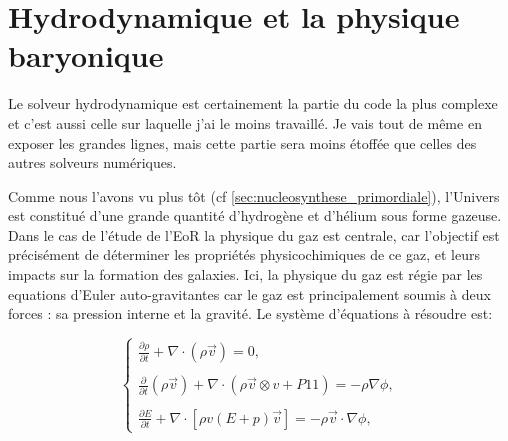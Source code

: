 %




\clearpage
\section{Hydrodynamique et la physique baryonique}
\label{sec:hydro}

Le solveur hydrodynamique est certainement la partie du code la plus complexe et c'est aussi celle sur laquelle j'ai le moins travaillé.
Je vais tout de même en exposer les grandes lignes, mais cette partie sera moins étoffée que celles des autres solveurs numériques.

Comme nous l'avons vu plus tôt (cf \ref{sec:nucleosynthese_primordiale}), l'Univers est constitué d'une grande quantité d'hydrogène et d'hélium sous forme gazeuse.
Dans le cas de l'étude de l'\ac{EoR} la physique du gaz est centrale, car l'objectif est précisément de déterminer les propriétés physicochimiques de ce gaz, et leurs impacts sur la formation des galaxies.
Ici, la physique du gaz est régie par les equations d'Euler auto-gravitantes car le gaz est principalement soumis à deux forces : sa pression interne et la gravité.
Le système d'équations à résoudre est:

\begin{equation}
\begin{cases}

{ \frac{ \partial \rho }{ \partial t } + \nabla \cdot (\rho \vec{v}) = 0}, \\
\\
{ \frac{ \partial }{ \partial t } (\rho \vec{v}) + \nabla \cdot (\rho \vec{v} \otimes v + P1\!\!1 )  = -\rho\nabla \phi }, \\
\\
{ \frac{ \partial E }{ \partial t } + \nabla \cdot [ \rho v (E+p)\vec{v} ] = -\rho \vec{v} \cdot \nabla \phi },

\end{cases}
\end{equation}
\label{eq:hydro}

